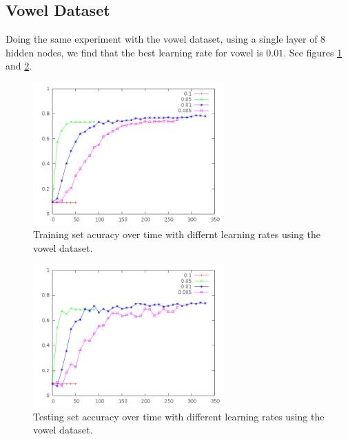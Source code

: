 \documentclass[12pt]{article}
\begin{document}
\subsection{Vowel Dataset}
Doing the same experiment with the vowel dataset, using a single layer of 8
hidden nodes, we find that the best learning rate for vowel is $0.01$. See
figures \ref{fig:vowel_learningrate_training} and \ref{fig:vowel_learningrate_testing}.
\begin{figure}[!ht]
    \begin{center}
        \includegraphics[width=0.65\textwidth]{vowel-learningrate-training}
    \end{center}
    \caption{Training set acuracy over time with differnt learning rates using the vowel dataset.}
  \label{fig:vowel_learningrate_training}
\end{figure}

\begin{figure}[!ht]
    \begin{center}
        \includegraphics[width=0.65\textwidth]{vowel-learningrate-testing}
    \end{center}
    \caption{Testing set accuracy over time with different learning rates using the vowel dataset.}
  \label{fig:vowel_learningrate_testing}
\end{figure}
\end{document}
